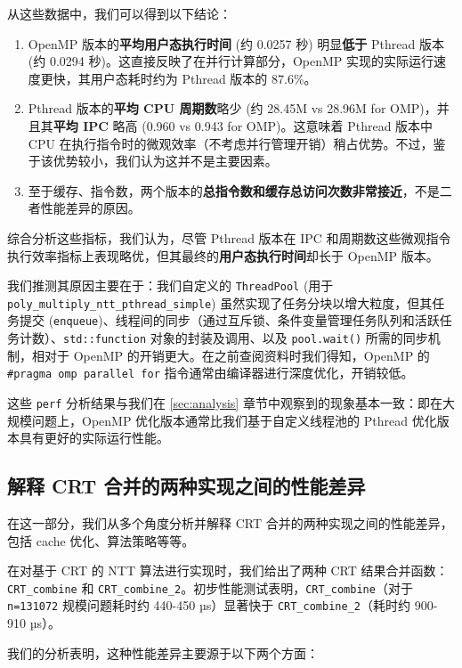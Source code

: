 \documentclass[a4paper]{article}
\begin{document}
从这些数据中，我们可以得到以下结论：

\begin{enumerate}
\item OpenMP 版本的\textbf{平均用户态执行时间} (约 0.0257 秒) 明显\textbf{低于} Pthread 版本 (约 0.0294 秒)。这直接反映了在并行计算部分，OpenMP 实现的实际运行速度更快，其用户态耗时约为 Pthread 版本的 87.6\%。
\item Pthread 版本的\textbf{平均 CPU 周期数}略少 (约 28.45M vs 28.96M for OMP)，并且其\textbf{平均 IPC} 略高 (0.960 vs 0.943 for OMP)。这意味着 Pthread 版本中 CPU 在执行指令时的微观效率（不考虑并行管理开销）稍占优势。不过，鉴于该优势较小，我们认为这并不是主要因素。
\item 至于缓存、指令数，两个版本的\textbf{总指令数和缓存总访问次数非常接近}，不是二者性能差异的原因。
\end{enumerate}

综合分析这些指标，我们认为，尽管 Pthread 版本在 IPC 和周期数这些微观指令执行效率指标上表现略优，但其最终的\textbf{用户态执行时间}却长于 OpenMP 版本。

我们推测其原因主要在于：我们自定义的 \texttt{ThreadPool} (用于 \texttt{poly\_multiply\_ntt\_pthread\_simple}) 虽然实现了任务分块以增大粒度，但其任务提交 (\texttt{enqueue})、线程间的同步（通过互斥锁、条件变量管理任务队列和活跃任务计数）、\texttt{std::function} 对象的封装及调用、以及 \texttt{pool.wait()} 所需的同步机制，相对于 OpenMP 的开销更大。在之前查阅资料时我们得知，OpenMP 的 \texttt{\#pragma omp parallel for} 指令通常由编译器进行深度优化，开销较低。

这些 \texttt{perf} 分析结果与我们在 \ref{sec:analysis} 章节中观察到的现象基本一致：即在大规模问题上，OpenMP 优化版本通常比我们基于自定义线程池的 Pthread 优化版本具有更好的实际运行性能。

\subsection{解释 CRT 合并的两种实现之间的性能差异}

在这一部分，我们从多个角度分析并解释 CRT 合并的两种实现之间的性能差异，包括 cache 优化、算法策略等等。

在对基于 CRT 的 NTT 算法进行实现时，我们给出了两种 CRT 结果合并函数：\texttt{CRT\_combine} 和 \texttt{CRT\_combine\_2}。初步性能测试表明，\texttt{CRT\_combine}（对于 \texttt{n=131072} 规模问题耗时约 440-450 µs）显著快于 \texttt{CRT\_combine\_2}（耗时约 900-910 µs）。

我们的分析表明，这种性能差异主要源于以下两个方面：
\end{document}
